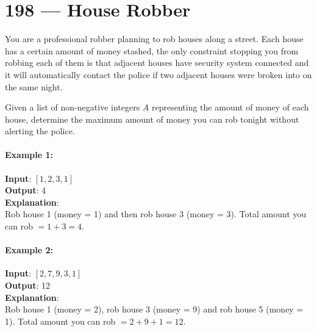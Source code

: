 \section{198 --- House Robber}
You are a professional robber planning to rob houses along a street. Each house has a certain amount of money stashed, the only constraint stopping you from robbing each of them is that adjacent houses have security system connected and it will automatically contact the police if two adjacent houses were broken into on the same night.
\par
Given a list of non-negative integers $A$ representing the amount of money of each house, determine the maximum amount of money you can rob tonight without alerting the police.
\paragraph{Example 1:}
\begin{flushleft}
\textbf{Input}: $[1,2,3,1]$
\\
\textbf{Output}: 4
\\
\textbf{Explanation}: 
\\
Rob house 1 (money = 1) and then rob house 3 (money = 3). Total amount you can rob $= 1 + 3 = 4$.
\end{flushleft}
\paragraph{Example 2:}
\begin{flushleft}
\textbf{Input}: $[2,7,9,3,1]$
\\
\textbf{Output}: 12
\\
\textbf{Explanation}:
\\
Rob house 1 (money = 2), rob house 3 (money = 9) and rob house 5 (money = 1). Total amount you can rob $= 2 + 9 + 1 = 12$.

\end{flushleft}   
